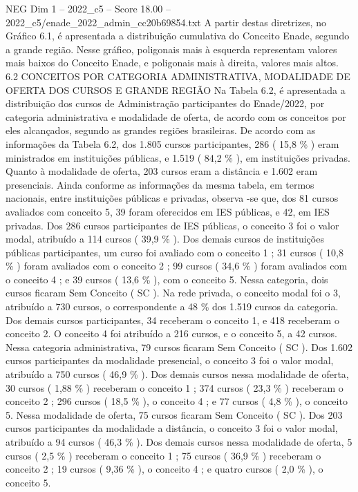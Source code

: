 \begin{textsample}{NEG Dim 1 – 2022\_c5 – Score 18.00 – 2022\_c5/enade\_2022\_admin\_cc20b69854.txt}
A partir destas diretrizes, no Gráfico 6.1, é apresentada a distribuição cumulativa do Conceito Enade, segundo a grande região.
Nesse gráfico, poligonais mais à esquerda representam valores mais baixos do Conceito Enade, e poligonais mais à direita, valores mais altos. 6.2 CONCEITOS POR CATEGORIA ADMINISTRATIVA, MODALIDADE DE OFERTA DOS CURSOS E GRANDE REGIÃO Na Tabela 6.2, é apresentada a distribuição dos cursos de Administração participantes do Enade/2022, por categoria administrativa e modalidade de oferta, de acordo com os conceitos por eles alcançados, segundo as grandes regiões brasileiras.
De acordo com as informações da Tabela 6.2, dos 1.805 cursos participantes, 286 ( 15,8 \% ) eram ministrados em instituições públicas, e 1.519 ( 84,2 \% ), em instituições privadas.
Quanto à modalidade de oferta, 203 cursos eram a distância e 1.602 eram presenciais.
Ainda conforme as informações da mesma tabela, em termos nacionais, entre instituições públicas e privadas, observa -se que, dos 81 cursos avaliados com conceito 5, 39 foram oferecidos em IES públicas, e 42, em IES privadas.
Dos 286 cursos participantes de IES públicas, o conceito 3 foi o valor modal, atribuído a 114 cursos ( 39,9 \% ).
Dos demais cursos de instituições públicas participantes, um curso foi avaliado com o conceito 1 ; 31 cursos ( 10,8 \% ) foram avaliados com o conceito 2 ; 99 cursos ( 34,6 \% ) foram avaliados com o conceito 4 ; e 39 cursos ( 13,6 \% ), com o conceito 5.
Nessa categoria, dois cursos ficaram Sem Conceito ( SC ).
Na rede privada, o conceito modal foi o 3, atribuído a 730 cursos, o correspondente a 48 \% dos 1.519 cursos da categoria.
Dos demais cursos participantes, 34 receberam o conceito 1, e 418 receberam o conceito 2.
O conceito 4 foi atribuído a 216 cursos, e o conceito 5, a 42 cursos.
Nessa categoria administrativa, 79 cursos ficaram Sem Conceito ( SC ).
Dos 1.602 cursos participantes da modalidade presencial, o conceito 3 foi o valor modal, atribuído a 750 cursos ( 46,9 \% ).
Dos demais cursos nessa modalidade de oferta, 30 cursos ( 1,88 \% ) receberam o conceito 1 ; 374 cursos ( 23,3 \% ) receberam o conceito 2 ; 296 cursos ( 18,5 \% ), o conceito 4 ; e 77 cursos ( 4,8 \% ), o conceito 5.
Nessa modalidade de oferta, 75 cursos ficaram Sem Conceito ( SC ).
Dos 203 cursos participantes da modalidade a distância, o conceito 3 foi o valor modal, atribuído a 94 cursos ( 46,3 \% ).
Dos demais cursos nessa modalidade de oferta, 5 cursos ( 2,5 \% ) receberam o conceito 1 ; 75 cursos ( 36,9 \% ) receberam o conceito 2 ; 19 cursos ( 9,36 \% ), o conceito 4 ; e quatro cursos ( 2,0 \% ), o conceito 5.

\end{textsample}
